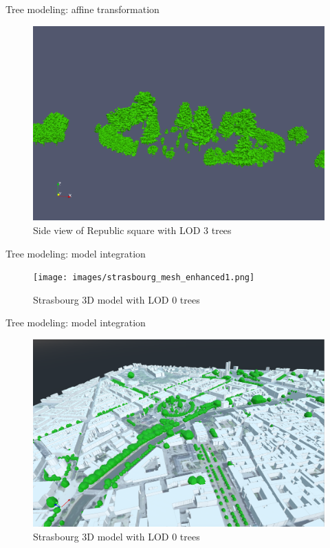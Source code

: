 \documentclass[10pt]{beamer}
\begin{document}
\begin{frame}{Tree modeling: affine transformation}
  \Large
  \begin{figure}[H]
    \centering
    \includegraphics[width=1\textwidth]{images/republic_lod3_side.png}
    \caption{Side view of Republic square with LOD 3 trees}
\end{figure}
\end{frame}

\begin{frame}{Tree modeling: model integration}
  \Large
  \begin{figure}[H]
    \centering
    \texttt{[image: images/strasbourg\_mesh\_enhanced1.png]}
    \caption{Strasbourg 3D model with LOD 0 trees}
\end{figure}
\end{frame}

\begin{frame}{Tree modeling: model integration}
  \Large
  \begin{figure}[H]
    \centering
    \includegraphics[width=1\textwidth]{images/strasbourg_mesh_enhanced2.png}
    \caption{Strasbourg 3D model with LOD 0 trees}
\end{figure}
\end{frame}
\end{document}
